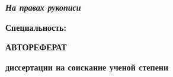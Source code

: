 \thispagestyle{empty}
\begin{center}
	\thesisOrganizationRU
\end{center}

\vspace{0pt plus1fill} %
	\begin{flushright}
		\textit{\textbf{На правах рукописи}}\\
	\end{flushright}

\vspace{0pt plus4fill} %
\begin{center}
\textbf {\thesisAuthorRU}
\end{center}

\vspace{0pt plus1fill} %
\begin{center}
\textbf {%
\thesisTitleRU}

\vspace{0pt plus1fill} %
\textbf {Специальность:} \textbf {\thesisSpecialtyNumberRU}\textbf {\thesisSpecialtyTitleRU}

\vspace{0pt plus1.5fill} %
\textbf {{АВТОРЕФЕРАТ}}\par
\textbf {{диссертации на соискание ученой степени}} \par \textbf { \thesisDegreeRU}
\end{center}

